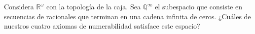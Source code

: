   \item[*17.] Considera $\mathbb{R}^{\omega}$ con la topología de la caja. Sea $\mathbb{Q}^{\infty}$ el subespacio que consiste en secuencias de racionales que terminan en una cadena infinita de ceros.  
    ¿Cuáles de nuestros cuatro axiomas de numerabilidad satisface este espacio?

   